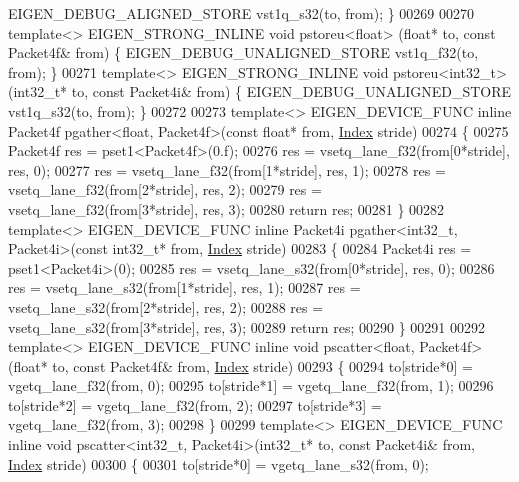 \begin{DoxyCode}
{{      EIGEN\_DEBUG\_ALIGNED\_STORE vst1q\_s32(to, from); \}
00269 
00270 \textcolor{keyword}{template}<> EIGEN\_STRONG\_INLINE \textcolor{keywordtype}{void} pstoreu<float>  (\textcolor{keywordtype}{float}*   to, \textcolor{keyword}{const} Packet4f& from) \{ 
      EIGEN\_DEBUG\_UNALIGNED\_STORE vst1q\_f32(to, from); \}
00271 \textcolor{keyword}{template}<> EIGEN\_STRONG\_INLINE \textcolor{keywordtype}{void} pstoreu<int32\_t>(int32\_t* to, \textcolor{keyword}{const} Packet4i& from) \{ 
      EIGEN\_DEBUG\_UNALIGNED\_STORE vst1q\_s32(to, from); \}
00272 
00273 \textcolor{keyword}{template}<> EIGEN\_DEVICE\_FUNC \textcolor{keyword}{inline} Packet4f pgather<float, Packet4f>(\textcolor{keyword}{const} \textcolor{keywordtype}{float}* from, 
      \hyperlink{namespace_eigen_a62e77e0933482dafde8fe197d9a2cfde}{Index} stride)
00274 \{
00275   Packet4f res = pset1<Packet4f>(0.f);
00276   res = vsetq\_lane\_f32(from[0*stride], res, 0);
00277   res = vsetq\_lane\_f32(from[1*stride], res, 1);
00278   res = vsetq\_lane\_f32(from[2*stride], res, 2);
00279   res = vsetq\_lane\_f32(from[3*stride], res, 3);
00280   \textcolor{keywordflow}{return} res;
00281 \}
00282 \textcolor{keyword}{template}<> EIGEN\_DEVICE\_FUNC \textcolor{keyword}{inline} Packet4i pgather<int32\_t, Packet4i>(\textcolor{keyword}{const} int32\_t* from, 
      \hyperlink{namespace_eigen_a62e77e0933482dafde8fe197d9a2cfde}{Index} stride)
00283 \{
00284   Packet4i res = pset1<Packet4i>(0);
00285   res = vsetq\_lane\_s32(from[0*stride], res, 0);
00286   res = vsetq\_lane\_s32(from[1*stride], res, 1);
00287   res = vsetq\_lane\_s32(from[2*stride], res, 2);
00288   res = vsetq\_lane\_s32(from[3*stride], res, 3);
00289   \textcolor{keywordflow}{return} res;
00290 \}
00291 
00292 \textcolor{keyword}{template}<> EIGEN\_DEVICE\_FUNC \textcolor{keyword}{inline} \textcolor{keywordtype}{void} pscatter<float, Packet4f>(\textcolor{keywordtype}{float}* to, \textcolor{keyword}{const} Packet4f& from, 
      \hyperlink{namespace_eigen_a62e77e0933482dafde8fe197d9a2cfde}{Index} stride)
00293 \{
00294   to[stride*0] = vgetq\_lane\_f32(from, 0);
00295   to[stride*1] = vgetq\_lane\_f32(from, 1);
00296   to[stride*2] = vgetq\_lane\_f32(from, 2);
00297   to[stride*3] = vgetq\_lane\_f32(from, 3);
00298 \}
00299 \textcolor{keyword}{template}<> EIGEN\_DEVICE\_FUNC \textcolor{keyword}{inline} \textcolor{keywordtype}{void} pscatter<int32\_t, Packet4i>(int32\_t* to, \textcolor{keyword}{const} Packet4i& from, 
      \hyperlink{namespace_eigen_a62e77e0933482dafde8fe197d9a2cfde}{Index} stride)
00300 \{
00301   to[stride*0] = vgetq\_lane\_s32(from, 0);
}}
\end{DoxyCode}
